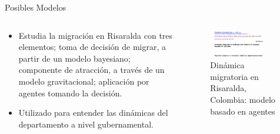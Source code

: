 \documentclass[17pt, t, lualatex]{beamer}
\begin{document}
\begin{frame}{Posibles Modelos}

  \begin{columns}
    \begin{column}{0.5\textwidth}
      \begin{itemize}
        \item Estudia la migración en Risaralda con tres elementos; toma de decisión de migrar, a partir de un modelo bayesiano; componente de atracción, a través de un modelo gravitacional; aplicación por agentes tomando la decisión.
        \item Utilizado para entender las dinámicas del departamento a nivel gubernamental.
      \end{itemize}
    \end{column}

    \begin{column}{0.5\textwidth}
  \begin{figure}[ht]
    \centering
    \includegraphics[width=0.8\textwidth]{img/fig2.png}
    \caption{Dinámica migratoria en Risaralda, Colombia: modelo basado en agentes\cite{renteria2023dinamica}}
    \label{fig:8}
  \end{figure}
    \end{column}
  \end{columns}

\end{frame}
\end{document}
